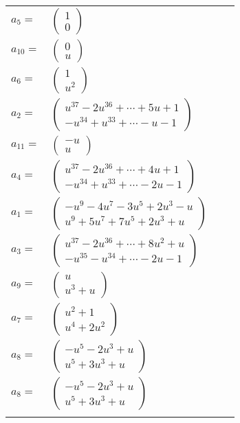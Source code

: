 \documentclass[1p]{elsarticle_modified}
\theoremstyle{definition}
\begin{document}
\begin{tabular}{m{7pt} m{180pt} m{7pt} m{180pt} }
\flushright $a_{5}=$&$\begin{pmatrix}1\\0\end{pmatrix}$ \\
\flushright $a_{10}=$&$\begin{pmatrix}0\\u\end{pmatrix}$ \\
\flushright $a_{6}=$&$\begin{pmatrix}1\\u^2\end{pmatrix}$ \\
\flushright $a_{2}=$&$\begin{pmatrix}u^{37}-2 u^{36}+\cdots+5 u+1\\- u^{34}+u^{33}+\cdots- u-1\end{pmatrix}$ \\
\flushright $a_{11}=$&$\begin{pmatrix}- u\\u\end{pmatrix}$ \\
\flushright $a_{4}=$&$\begin{pmatrix}u^{37}-2 u^{36}+\cdots+4 u+1\\- u^{34}+u^{33}+\cdots-2 u-1\end{pmatrix}$ \\
\flushright $a_{1}=$&$\begin{pmatrix}- u^9-4 u^7-3 u^5+2 u^3- u\\u^9+5 u^7+7 u^5+2 u^3+u\end{pmatrix}$ \\
\flushright $a_{3}=$&$\begin{pmatrix}u^{37}-2 u^{36}+\cdots+8 u^2+u\\- u^{35}- u^{34}+\cdots-2 u-1\end{pmatrix}$ \\
\flushright $a_{9}=$&$\begin{pmatrix}u\\u^3+u\end{pmatrix}$ \\
\flushright $a_{7}=$&$\begin{pmatrix}u^2+1\\u^4+2 u^2\end{pmatrix}$ \\
\flushright $a_{8}=$&$\begin{pmatrix}- u^5-2 u^3+u\\u^5+3 u^3+u\end{pmatrix}$\\ \flushright $a_{8}=$&$\begin{pmatrix}- u^5-2 u^3+u\\u^5+3 u^3+u\end{pmatrix}$\\&\end{tabular}
\end{document}
